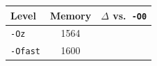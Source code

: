 \begin{tabular*}{\columnwidth}{@{\extracolsep\fill}lcc@{\extracolsep\fill}}
\toprule
\textbf{Level} & \textbf{Memory} & \textbf{$\Delta$ vs.\ \texttt{-O0}} \\
\midrule
\texttt{-Oz} & 1564 &  \\
\texttt{-Ofast} & 1600 &  \\
\bottomrule
\end{tabular*}
